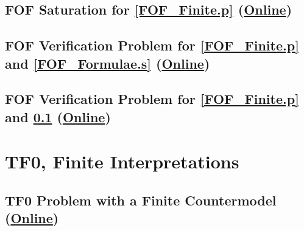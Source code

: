\documentclass{easychair}
\begin{document}
\newpage
\subsection{FOF Saturation for \ref{FOF_Finite.p}
(\href{https://raw.githubusercontent.com/GeoffsPapers/InterpretationFormat/master/Examples/FOF_Saturation.s}{Online})}
\label{FOF_Saturation.s}
\begin{small}

\end{small}

\newpage
\subsection{FOF Verification Problem for \ref{FOF_Finite.p} and \ref{FOF_Formulae.s}
(\href{https://raw.githubusercontent.com/GeoffsPapers/InterpretationFormat/master/Examples/FOF_Formulae.s.p}{Online})}
\label{FOF_Formulae.s.p}
\begin{small}

\end{small}

\newpage
\subsection{FOF Verification Problem for \ref{FOF_Finite.p} and \ref{FOF_Saturation.s}
(\href{https://raw.githubusercontent.com/GeoffsPapers/InterpretationFormat/master/Examples/FOF_Saturation.s.p}{Online})}
\label{FOF_Saturation.s.p}
\begin{small}

\end{small}

\newpage
\section{TF0, Finite Interpretations}
\label{TF0Finite}

\subsection{TF0 Problem with a Finite Countermodel
(\href{https://raw.githubusercontent.com/GeoffsPapers/InterpretationFormat/master/Examples/TFF_Finite.p}{Online})}
\label{TFF_Finite.p}
\begin{small}

\end{small}
\end{document}
